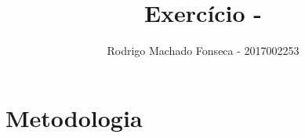 \documentclass[12pt]{article}
\begin{document}

\pagestyle{fancy}
\fancyhf{}
\renewcommand{\headrulewidth}{0.4pt}
\fancyfoot[C]{\thepage}
\renewcommand{\footrulewidth}{0.4pt}
\fancyfoot[C]{\thepage}
\title{\LARGE \bf
 Exercício  - }
\author{ Rodrigo Machado Fonseca - 2017002253}
\thispagestyle{fancy}
\maketitle
\thispagestyle{fancy}

\section{Metodologia}





\begin{thebibliography}{99}
		\label{BreastCancer}
\end{thebibliography}	
\end{document}
